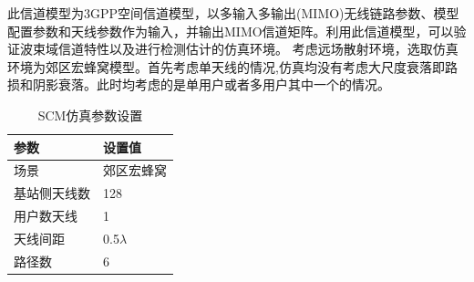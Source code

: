 \documentclass[bachelor,nocolorlinks, printoneside]{seuthesis} %
\begin{document}
\begin{Main}
此信道模型为3GPP空间信道模型，以多输入多输出(MIMO)无线链路参数、模型配置参数和天线参数作为输入，并输出MIMO信道矩阵。利用此信道模型，可以验证波束域信道特性以及进行检测估计的仿真环境。
考虑远场散射环境，选取仿真环境为郊区宏蜂窝模型。首先考虑单天线的情况,仿真均没有考虑大尺度衰落即路损和阴影衰落。此时均考虑的是单用户或者多用户其中一个的情况。
\begin{table}[htbp]
	\centering
	\caption{\label{tab:test}SCM仿真参数设置}
	\begin{tabular}{ll}
		\toprule
		参数 &  设置值 \\
				\bottomrule
		场景 &  郊区宏蜂窝 \\
				\bottomrule
		基站侧天线数 & 128 \\
				\bottomrule
		用户数天线	& 1 \\
				\bottomrule
		天线间距 & 0.5$\lambda$ \\
				\bottomrule
		路径数 & 6 \\
		\bottomrule
	\end{tabular}
\end{table}
	

\end{Main}
\end{document}
